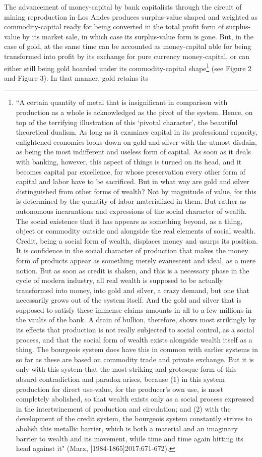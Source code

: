 \documentclass[]{interact}
\theoremstyle{plain}%
\theoremstyle{definition}
\theoremstyle{remark}
\begin{document}
The advancement of money-capital by bank capitalists through the circuit of mining reproduction in Los Andes produces surplus-value shaped and weighted as commodity-capital ready for being converted in the total profit form of surplus-value by its market sale, in which case its surplus-value form is gone. But, in the case of gold, at the same time can be accounted as money-capital able for being transformed into profit by its exchange for pure currency money-capital, or can either still being gold hoarded under its commodity-capital shape\footnote{“A certain quantity of metal that is insignificant in  comparison with production as a whole is acknowledged as the pivot of the  system. Hence, on top of the terrifying illustration of this ‘pivotal character’, the beautiful theoretical dualism. As long as it examines capital in its professional capacity, enlightened economics looks down on gold and silver with the utmost disdain, as being the most indifferent and useless form of capital. As soon as it deals with banking, however, this aspect of things is turned on its head, and it becomes capital par excellence, for whose preservation every other form of capital and labor have to be sacrificed. But in what way are gold and silver distinguished from other forms of wealth? Not by magnitude of value, for this is determined by the quantity of labor materialized in them. But rather as autonomous incarnations and expressions of the social character of wealth. The social existence that it has appears as something beyond, as a thing, object or commodity outside and alongside the real elements of social wealth. Credit, being a social form of wealth, displaces money and usurps its position. It is confidence in the social character of production that makes the money form of products appear as something merely evanescent and ideal, as a mere notion. But as soon as credit is shaken, and this is a necessary phase in the cycle of modern industry, all real wealth is supposed to be actually transformed into money,  into gold and silver, a crazy demand, but one that necessarily grows out of the system itself. And the gold and silver that is supposed to satisfy these immense claims amounts in all to a few millions in the vaults of the bank. A drain of bullion, therefore, shows most strikingly by its effects that production is not  really subjected to social control, as a social process, and that the social form of wealth exists alongside wealth itself as a thing. The bourgeois system does have this in common with earlier systems in so far as these are based on commodity trade and private exchange. But it is only with this system that the most striking and grotesque form of this absurd contradiction and paradox arises, because (1) in this system production for direct use-value, for the producer’s own use, is most completely abolished, so that wealth exists only as a social process expressed in the intertwinement of production and circulation; and (2) with the development of the credit system, the bourgeois system constantly strives to abolish this metallic barrier, which is both a material and an imaginary barrier to wealth and its movement, while time and time again hitting its head against it" (Marx, [1984-1865]2017:671-672).} (see Figure 2 and Figure 3). In that manner, gold retains its 
\end{document}

